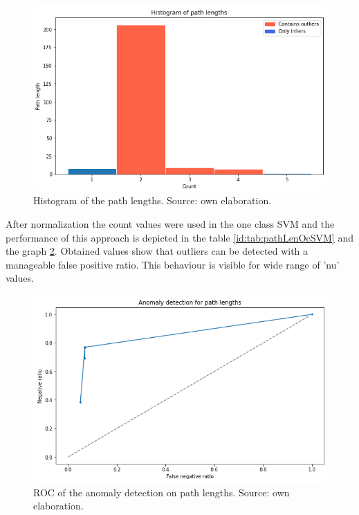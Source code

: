 \documentclass[a4paper,twoside,12pt]{book}
\begin{document}
\begin{figure}
	\centering
	\includegraphics[scale=0.9]{images/pathLenHist}
	\caption{Histogram of the path lengths. Source: own elaboration.}
	\label{fig:pathLenHist}
 \end{figure}

After normalization the count values were used in the one class SVM and the performance
of this approach is depicted in the table \ref{id:tab:pathLenOcSVM} and the graph \ref{fig:pathLenROC}. 
Obtained values show that outliers can be detected with a manageable false positive ratio. This 
behaviour is visible for wide range of 'nu' values. 

\begin{figure}
	\centering
	\includegraphics[scale=0.9]{images/PathLenROC}
	\caption{ROC of the anomaly detection on path lengths. Source: own elaboration.}
	\label{fig:pathLenROC}
 \end{figure}
\end{document}
